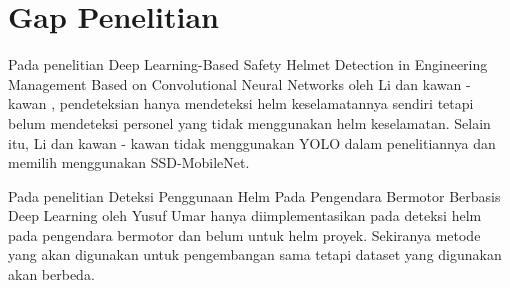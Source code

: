 \section{Gap Penelitian}
Pada penelitian Deep Learning-Based Safety Helmet Detection in Engineering Management Based on Convolutional Neural Networks oleh Li dan kawan - kawan , pendeteksian hanya mendeteksi helm keselamatannya sendiri tetapi belum mendeteksi personel yang tidak menggunakan helm keselamatan. Selain itu, Li dan kawan - kawan tidak menggunakan YOLO dalam penelitiannya dan memilih menggunakan SSD-MobileNet.
\par Pada penelitian Deteksi Penggunaan Helm Pada Pengendara Bermotor Berbasis Deep Learning oleh Yusuf Umar hanya diimplementasikan pada deteksi helm pada pengendara bermotor dan belum untuk helm proyek. Sekiranya metode yang akan digunakan untuk pengembangan sama tetapi dataset yang digunakan akan berbeda.


















